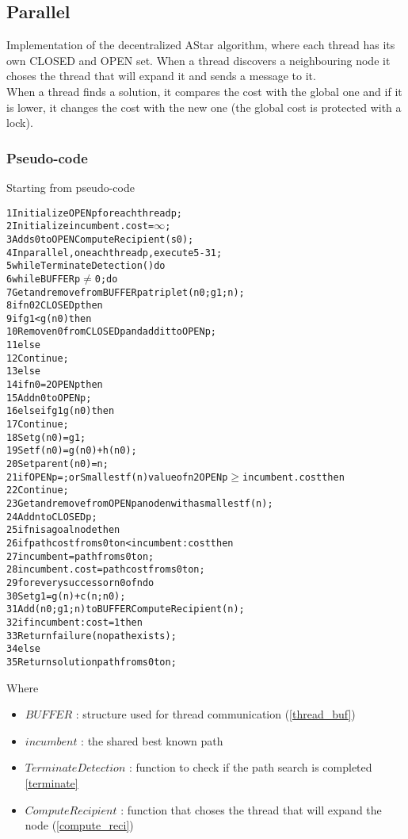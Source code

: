 \subsection{Parallel}

Implementation of the decentralized AStar algorithm, where each thread has its own CLOSED and OPEN set.
When a thread discovers a neighbouring node it choses the thread that will expand it and sends a message to it.
\\
When a thread finds a solution, it compares the cost with the global one and if it is lower, it changes the cost with the new one (the global cost is protected with a lock).

\subsubsection{Pseudo-code}

Starting from pseudo-code \cite{bibParAstar}

\begin{alltt}
    1 Initialize OPENp for each thread p;
    2 Initialize incumbent.cost = \(\infty\);
    3 Add s0 to OPENComputeRecipient(s0);
    4 In parallel, on each thread p, execute 5-31;
    5 while TerminateDetection() do
    6   while BUFFERp \(\neq\) 0 ; do
    7       Get and remove from BUFFERp a triplet (n0; g1; n);
    8       if n0 2 CLOSEDp then
    9           if g1 < g(n0) then
    10              Remove n0 from CLOSEDp and add it to OPENp;
    11             else
    12                  Continue;
    13      else
    14          if n0 =2 OPENp then
    15              Add n0 to OPENp;
    16          else if g1  g(n0) then
    17              Continue;
    18      Set g(n0) = g1;
    19      Set f(n0) = g(n0) + h(n0);
    20      Set parent(n0) = n;
    21  if OPENp = ; or Smallest f(n) value of n 2 OPENp \(\geq\) incumbent.cost then
    22      Continue;
    23  Get and remove from OPENp a node n with a smallest f(n);
    24  Add n to CLOSEDp;
    25  if n is a goal node then
    26      if path cost from s0 to n < incumbent:cost then
    27          incumbent = path from s0 to n;
    28          incumbent.cost = path cost from s0 to n;
    29  for every successor n0 of n do
    30      Set g1 = g(n) + c(n; n0);
    31      Add (n0; g1; n) to BUFFER ComputeRecipient(n);
    32 if incumbent:cost = 1 then
    33  Return failure (no path exists);
    34 else
    35  Return solution path from s0 to n;
\end{alltt}

Where
\begin{itemize}
    \item $BUFFER$ : structure used for thread communication (\ref{thread_buf})
    \item $incumbent$ : the shared best known path
    \item $TerminateDetection$ : function to check if the path search is completed \ref{terminate}
    \item $ComputeRecipient$ : function that choses the thread that will expand the node (\ref{compute_reci})
\end{itemize}

